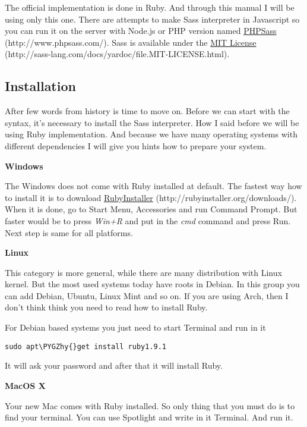 \documentclass[a4paper,12pt,oneside,pdftex]{sphinxmanual}
\def\PYGZhy{\char`\-}
\begin{document}
The official implementation is done in Ruby. And through this manual I will be using only this one. There are attempts to make Sass interpreter in Javascript so you can run it on the server with Node.js or PHP version named \href{http://www.phpsass.com/}{PHPSass} (http://www.phpsass.com/). Sass is available under the \href{http://sass-lang.com/docs/yardoc/file.MIT-LICENSE.html}{MIT License} (http://sass-lang.com/docs/yardoc/file.MIT-LICENSE.html).


\subsection{Installation}
\label{src/sass:installation}
After few words from history is time to move on. Before we can start with the syntax, it's necessary to install the Sass interpreter. How I said before we will be using Ruby implementation. And because we have many operating systems with different dependencies I will give you hints how to prepare your system.

\textbf{Windows}

The Windows does not come with  Ruby installed at default. The fastest way how to install it is to download \href{http://rubyinstaller.org/downloads/}{RubyInstaller} (http://rubyinstaller.org/downloads/).
When it is done, go to Start Menu, Accessories and run Command Prompt. But faster would be to press \emph{Win+R} and put in the \emph{cmd} command and press Run. Next step is same for all platforms.

\textbf{Linux}

This category is more general, while there are many distribution with Linux kernel. But the most used systems today have roots in Debian. In this group you can add Debian, Ubuntu, Linux Mint and so on. If you are using Arch, then I don't think think you need to read how to install Ruby.

For Debian based systems you just need to start Terminal and run in it

\begin{Verbatim}[commandchars=\\\{\}]
sudo apt\PYGZhy{}get install ruby1.9.1
\end{Verbatim}

It will ask your password and after that it will install Ruby.

\textbf{MacOS X}

Your new Mac comes with Ruby installed. So only thing that you must do is to find your terminal. You can use Spotlight and write in it Terminal. And run it.
\end{document}
